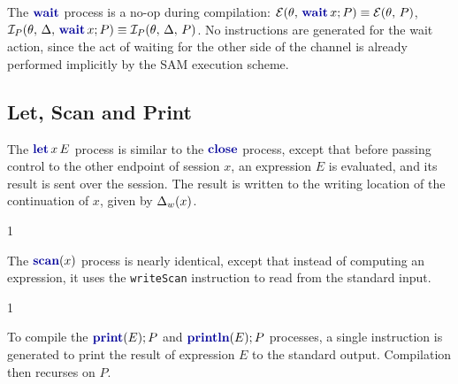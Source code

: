 The $\waitp$ process is a no-op during compilation: $\getendpoints{\theta}{\waitc{x}{P}} \equiv \getendpoints{\theta}{P}$, $\getinstructions{\theta}{\Delta}{\waitc{x}{P}} \equiv \getinstructions{\theta}{\Delta}{P}$. No instructions are generated for the wait action, since the act of waiting for the other side of the channel is already performed implicitly by the \ac{SAM} execution scheme.

\subsection{Let, Scan and Print}

The $\letc{x}{E}$ process is similar to the $\closep$ process, except that before passing control to the other endpoint of session $x$, an expression $E$ is evaluated, and its result is sent over the session. The result is written to the writing location of the continuation of $x$, given by $\Delta_w(x)$.

\begin{compilation}{\theta}{\Delta}{}
{1}
\end{compilation}

The $\scanc{x}$ process is nearly identical, except that instead of computing an expression, it uses the \texttt{writeScan} instruction to read from the standard input.

\begin{compilation}{\theta}{\Delta}{}
{1}
     
\end{compilation}

To compile the $\printc{E}P$ and $\printlnc{E}{P}$ processes, a single instruction is generated to print the result of expression $E$ to the standard output. Compilation then recurses on $P$.

\begin{figure}[H]
    \begin{minipage}{0.45\textwidth}
    \begin{compilation}{\theta}{\Delta}{}
    {}
    \end{compilation}
    \end{minipage}
    \hfill
    \begin{minipage}{0.45\textwidth}
    \begin{compilation}{\theta}{\Delta}{}
    {}
    \end{compilation}
    \end{minipage}
\end{figure}

